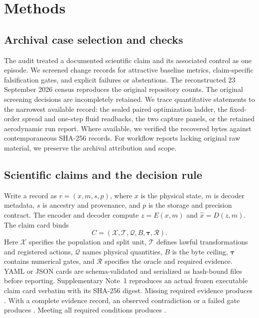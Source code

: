 \documentclass[10pt,a4paper,twocolumn]{article}
\newcommand{\gate}[1]{\text{\textbf{#1}}}
\begin{document}
\section{Methods}

\subsection{Archival case selection and checks}
The audit treated a documented scientific claim and its associated control as one episode. We screened change records for attractive baseline metrics, claim-specific falsification gates, and explicit failures or abstentions. The reconstructed 23 September 2026 census reproduces the original repository counts. The original screening decisions are incompletely retained. We trace quantitative statements to the narrowest available record: the sealed paired optimization ladder, the fixed-order spread and one-step fluid readbacks, the two capture panels, or the retained aerodynamic run report. Where available, we verified the recovered bytes against contemporaneous SHA-256 records. For workflow reports lacking original raw material, we preserve the archival attribution and scope.

\subsection{Scientific claims and the decision rule}
Write a record as $r=(x,m,s,p)$, where $x$ is the physical state, $m$ is decoder metadata, $s$ is ancestry and provenance, and $p$ is the storage and precision contract. The encoder and decoder compute $z=E(x,m)$ and $\hat{x}=D(z,m)$. The claim card binds
\begin{equation}
 C=(\mathcal X,\mathcal T,\mathcal Q,B,\symbf{\tau},\mathcal R).
\end{equation}
Here $\mathcal X$ specifies the population and split unit, $\mathcal T$ defines lawful transformations and registered actions, $\mathcal Q$ names physical quantities, $B$ is the byte ceiling, $\symbf{\tau}$ contains numerical gates, and $\mathcal R$ specifies the oracle and required evidence. YAML or JSON cards are schema-validated and serialized as hash-bound files before reporting. Supplementary Note~1 reproduces an actual frozen executable claim card verbatim with its SHA-256 digest. Missing required evidence produces \gate{ABSTAIN}. With a complete evidence record, an observed contradiction or a failed gate produces \gate{FAIL}. Meeting all required conditions produces \gate{PASS}.
\end{document}

